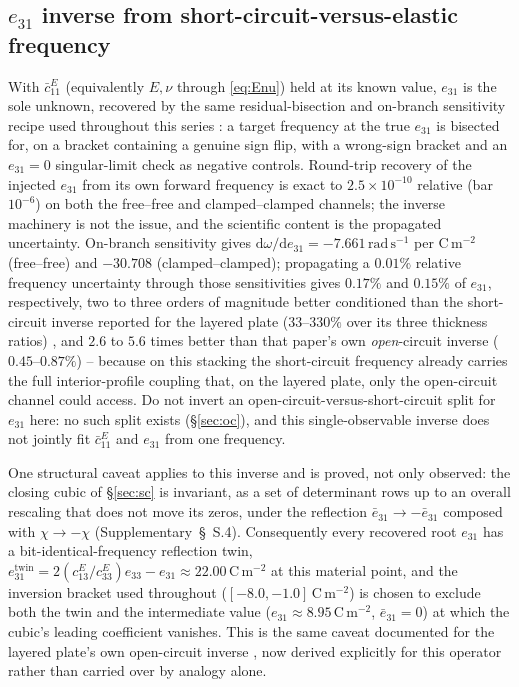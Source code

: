 \documentclass[11pt]{article}
\newcommand{\eebar}{\bar{e}_{31}}
\newcommand{\cbar}{\bar{c}_{11}^{E}}
\begin{document}
\subsection{$e_{31}$ inverse from short-circuit-versus-elastic
frequency}\label{sec:inverse}
With $\cbar$ (equivalently $E,\nu$ through \eqref{eq:Enu}) held at its
known value, $e_{31}$ is the sole unknown, recovered by the same
residual-bisection and on-branch sensitivity recipe used throughout this
series \cite{mccune2026ring,mccune2026piezo}: a target frequency at the
true $e_{31}$ is bisected for, on a bracket containing a genuine sign
flip, with a wrong-sign bracket and an $e_{31}=0$ singular-limit check as
negative controls. Round-trip recovery of the injected $e_{31}$ from its
own forward frequency is exact to $2.5\times10^{-10}$ relative (bar
$10^{-6}$) on both the free--free and clamped--clamped channels; the
inverse machinery is not the issue, and the scientific content is the
propagated uncertainty. On-branch sensitivity gives
$\mathrm d\omega/\mathrm de_{31}=-7.661\,\mathrm{rad\,s^{-1}}$ per
$\mathrm{C\,m^{-2}}$ (free--free) and $-30.708$ (clamped--clamped);
propagating a $0.01\%$ relative frequency uncertainty through those
sensitivities gives $0.17\%$ and $0.15\%$ of $e_{31}$, respectively,
two to three orders of magnitude better conditioned than the
short-circuit inverse reported for the layered plate
($33$--$330\%$ over its three thickness ratios) \cite{mccune2026piezo},
and $2.6$ to $5.6$ times better than that paper's own
\emph{open}-circuit inverse ($0.45$--$0.87\%$) -- because on this
stacking the short-circuit frequency already carries the full
interior-profile coupling that, on the layered plate, only the
open-circuit channel could access. Do not invert
an open-circuit-versus-short-circuit split for $e_{31}$ here: no such
split exists (\S\ref{sec:oc}), and this single-observable inverse does
not jointly fit $\cbar$ and $e_{31}$ from one frequency.

One structural caveat applies to this inverse and is proved, not only
observed: the closing cubic of \S\ref{sec:sc} is invariant, as a set of
determinant rows up to an overall rescaling that does not move its
zeros, under the reflection $\eebar\to-\eebar$ composed with
$\chi\to-\chi$ (Supplementary~\S~S.4). Consequently every recovered root
$e_{31}$ has a bit-identical-frequency reflection twin,
$e_{31}^{\mathrm{twin}}=2(c_{13}^E/c_{33}^E)e_{33}-e_{31}
\approx22.00\,\mathrm{C\,m^{-2}}$ at this material point, and the
inversion bracket used throughout ($[-8.0,-1.0]\,\mathrm{C\,m^{-2}}$) is
chosen to exclude both the twin and the intermediate value
($e_{31}\approx8.95\,\mathrm{C\,m^{-2}}$, $\eebar=0$) at which the
cubic's leading coefficient vanishes. This is the same
caveat documented for the layered plate's own open-circuit inverse
\cite{mccune2026piezo}, now derived explicitly for this operator rather
than carried over by analogy alone.
\end{document}
